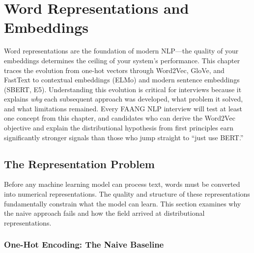 
\chapter{Word Representations and Embeddings}
\label{chap:word_representations}

\begin{tldr}
Word representations are the foundation of modern NLP---the quality of your
embeddings determines the ceiling of your system's performance.  This chapter
traces the evolution from one-hot vectors through Word2Vec, GloVe, and FastText
to contextual embeddings (ELMo) and modern sentence embeddings (SBERT, E5).
Understanding this evolution is critical for interviews because it explains
\emph{why} each subsequent approach was developed, what problem it solved, and
what limitations remained.  Every FAANG NLP interview will test at least one
concept from this chapter, and candidates who can derive the Word2Vec objective
and explain the distributional hypothesis from first principles earn
significantly stronger signals than those who jump straight to ``just use
BERT.''
\end{tldr}

\bigskip

\section{The Representation Problem}
\label{sec:representation_problem}

Before any machine learning model can process text, words must be converted
into numerical representations.  The quality and structure of these
representations fundamentally constrain what the model can learn.  This section
examines why the naive approach fails and how the field arrived at
distributional representations.

\subsection{One-Hot Encoding: The Naive Baseline}

